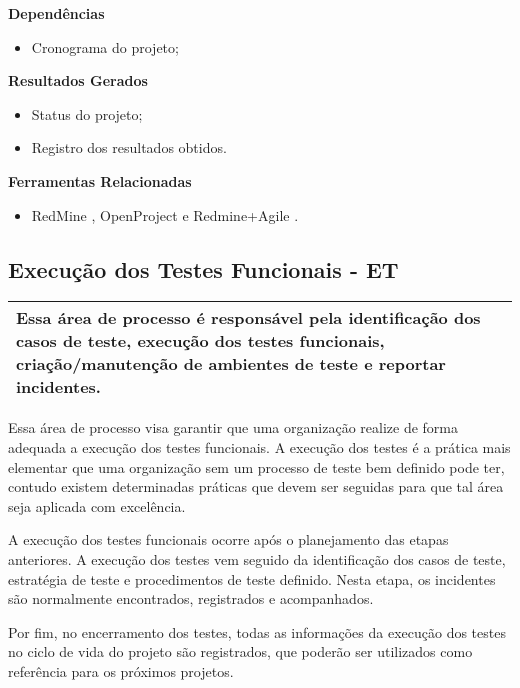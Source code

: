 \textbf{Dependências}
\begin{itemize}
    \item Cronograma do projeto;
\end{itemize}

\textbf{Resultados Gerados}
\begin{itemize}
    \item  Status do projeto;
    \item  Registro dos resultados obtidos.
\end{itemize}

\textbf{Ferramentas Relacionadas}
\begin{itemize}
    \item RedMine \cite{Redmine}, OpenProject \cite{OpenProject} e Redmine+Agile \cite{RedmineUP}.
\end{itemize}

\subsection{Execução dos Testes Funcionais - ET}
\label{sec:et0}

\begin{table}[!ht]
\centering
\begin{tabular}{|p{130mm}|}
\hline
Essa área de processo é responsável pela identificação dos casos de teste, execução dos testes funcionais, criação/manutenção de ambientes de teste e reportar incidentes. \\ 
\hline
\end{tabular}
\end{table}

Essa área de processo visa garantir que uma organização realize de forma adequada a execução dos testes funcionais. A execução dos testes é a prática mais elementar que uma organização sem um processo de teste bem definido pode ter, contudo existem determinadas práticas que devem ser seguidas para que tal área seja aplicada com excelência.

A execução dos testes funcionais ocorre após o planejamento das etapas anteriores. A execução dos testes vem seguido da identificação dos casos de teste, estratégia de teste e procedimentos de teste definido. Nesta etapa, os incidentes são normalmente encontrados, registrados e acompanhados.

Por fim, no encerramento dos testes, todas as informações da execução dos testes no ciclo de vida do projeto são registrados, que poderão ser utilizados como referência para os próximos projetos.

